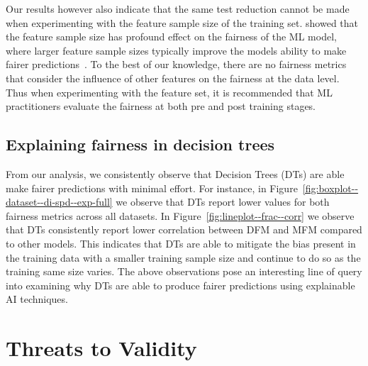 \documentclass{article}
\begin{document}

Our results however also indicate that the same test reduction cannot
be made when experimenting with the feature sample size of the
training set. \citeauthor{zhang2021ignorance} showed that the feature
sample size has profound effect on the fairness of the ML model, where
larger feature sample sizes typically improve the models ability to
make fairer predictions \cite{zhang2021ignorance}. To the best of our
knowledge, there are no fairness metrics that consider the influence
of other features on the fairness at the data level. Thus when
experimenting with the feature set, it is recommended that ML
practitioners evaluate the fairness at both pre and post training
stages.

\subsection{Explaining fairness in decision trees}\label{sec:discuss-explain-fair-dt}


From our analysis, we consistently observe that Decision Trees (DTs)
are able make fairer predictions with minimal effort. For instance, in
Figure \ref{fig:boxplot--dataset--di-spd--exp-full} we observe that
DTs report lower values for both fairness metrics across all datasets.
In Figure \ref{fig:lineplot--frac--corr} we observe that DTs
consistently report lower correlation between DFM and MFM compared to
other models. This indicates that DTs are able to mitigate the bias
present in the training data with a smaller training sample size and
continue to do so as the training same size varies. The above
observations pose an interesting line of query into examining why DTs
are able to produce fairer predictions using explainable AI
techniques.

\section{Threats to Validity}\label{sec:threats}
\end{document}
